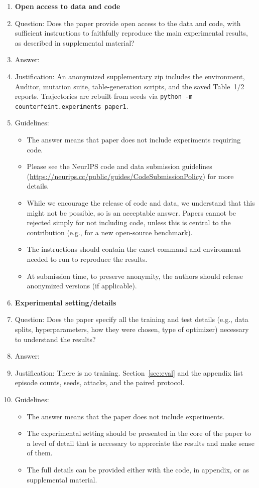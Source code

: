 \begin{enumerate}
\item {\bf Open access to data and code}
    \item[] Question: Does the paper provide open access to the data and code, with sufficient instructions to faithfully reproduce the main experimental results, as described in supplemental material?
    \item[] Answer: \answerYes{}
    \item[] Justification: An anonymized supplementary zip includes the environment, Auditor, mutation suite, table-generation scripts, and the saved Table~1/2 reports. Trajectories are rebuilt from seeds via \texttt{python -m counterfeint.experiments paper1}.
    \item[] Guidelines:
    \begin{itemize}
        \item The answer \answerNA{} means that paper does not include experiments requiring code.
        \item Please see the NeurIPS code and data submission guidelines (\url{https://neurips.cc/public/guides/CodeSubmissionPolicy}) for more details.
        \item While we encourage the release of code and data, we understand that this might not be possible, so \answerNo{} is an acceptable answer. Papers cannot be rejected simply for not including code, unless this is central to the contribution (e.g., for a new open-source benchmark).
        \item The instructions should contain the exact command and environment needed to run to reproduce the results.
        \item At submission time, to preserve anonymity, the authors should release anonymized versions (if applicable).
    \end{itemize}

\item {\bf Experimental setting/details}
    \item[] Question: Does the paper specify all the training and test details (e.g., data splits, hyperparameters, how they were chosen, type of optimizer) necessary to understand the results?
    \item[] Answer: \answerYes{}
    \item[] Justification: There is no training. Section~\ref{sec:eval} and the appendix list episode counts, seeds, attacks, and the paired protocol.
    \item[] Guidelines:
    \begin{itemize}
        \item The answer \answerNA{} means that the paper does not include experiments.
        \item The experimental setting should be presented in the core of the paper to a level of detail that is necessary to appreciate the results and make sense of them.
        \item The full details can be provided either with the code, in appendix, or as supplemental material.
    \end{itemize}


\end{enumerate}
